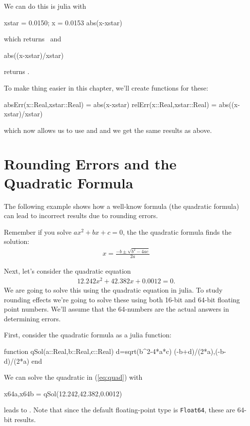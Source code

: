 We can do this is julia with 
\begin{jlblock}[root]
xstar = 0.0150;
x = 0.0153
abs(x-xstar)
\end{jlblock}
which returns  \printpythontex[verb]~and 
\begin{jlblock}[root]
abs((x-xstar)/xstar)
\end{jlblock}
returns  \printpythontex[verb].

To make thing easier in this chapter, we'll create functions for these:
\begin{jlblock}[root]
absErr(x::Real,xstar::Real) = abs(x-xstar)
relErr(x::Real,xstar::Real) = abs((x-xstar)/xstar)
\end{jlblock}
which now allows us to use  and  and we get the same results as above.  


\hypertarget{rounding-errors-and-the-quadratic-formula}{%
\section{Rounding Errors and the Quadratic
Formula}\label{rounding-errors-and-the-quadratic-formula}}

The following example shows how a well-know formula (the quadratic
formula) can lead to incorrect results due to rounding errors.

Remember if you solve $a{x}^{2}+bx+c=0$, the the quadratic formula
finds the solution: \begin{align*} x=\frac{-b \pm \sqrt{b^{2}-4ac} } {2a}\end{align*}

Next, let's consider the quadratic equation 
\begin{align}
12.242{x}^{2}+42.382x+0.0012=0. \label{eq:quad}
\end{align}
 We are going to solve this using the quadratic equation in julia.  To study rounding effects we're going to solve these using both 16-bit and 64-bit floating point numbers.  We'll assume that the 64-numbers are the actual answers in determining errors.  
 
First, consider the quadratic formula as a julia function: 
%
\begin{jlblock}[root]
function qSol(a::Real,b::Real,c::Real)
  d=sqrt(b^2-4*a*c)
  (-b+d)/(2*a),(-b-d)/(2*a)
end
\end{jlblock}

We can solve the quadratic in (\ref{eq:quad}) with
\begin{jlblock}[root]
x64a,x64b = qSol(12.242,42.382,0.0012)
\end{jlblock}
%
leads to \printpythontex[verb].  Note that since the default floating-point type is \texttt{Float64}, these are 64-bit results.  

